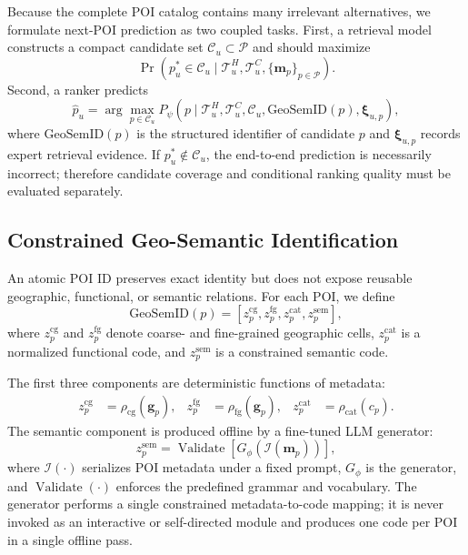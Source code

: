 \documentclass[journal]{IEEEtran}
\newcommand{\gsid}{\mathrm{GeoSemID}}
\newcommand{\POIs}{\mathcal{P}}
\begin{document}
Because the complete POI catalog contains many irrelevant alternatives, we
formulate next-POI prediction as two coupled tasks.
First, a retrieval model constructs a compact candidate set
$\mathcal{C}_u\subset\POIs$ and should maximize
\begin{equation}
\Pr(p_u^{*}\in\mathcal{C}_u
\mid
\mathcal{T}_{u}^{H},\mathcal{T}_{u}^{C},\{\bm{m}_p\}_{p\in\POIs}).
\label{eq:coverage_objective}
\end{equation}
Second, a ranker predicts
\begin{equation}
\widehat{p}_{u}
=
\arg\max_{p\in\mathcal{C}_u}
P_{\psi}
\left(
p\mid
\mathcal{T}_{u}^{H},
\mathcal{T}_{u}^{C},
\mathcal{C}_u,
\gsid(p),
\bm{\xi}_{u,p}
\right),
\label{eq:final_prediction}
\end{equation}
where $\gsid(p)$ is the structured identifier of candidate $p$ and
$\bm{\xi}_{u,p}$ records expert retrieval evidence.
If $p_u^{*}\notin\mathcal{C}_u$, the end-to-end prediction is necessarily
incorrect; therefore candidate coverage and conditional ranking quality must
be evaluated separately.

\subsection{Constrained Geo-Semantic Identification}

An atomic POI ID preserves exact identity but does not expose reusable
geographic, functional, or semantic relations.
For each POI, we define
\begin{equation}
\gsid(p)
=
[
z_{p}^{\mathrm{cg}},
z_{p}^{\mathrm{fg}},
z_{p}^{\mathrm{cat}},
z_{p}^{\mathrm{sem}}
],
\label{eq:geosemid_definition}
\end{equation}
where $z_{p}^{\mathrm{cg}}$ and $z_{p}^{\mathrm{fg}}$ denote coarse- and
fine-grained geographic cells, $z_{p}^{\mathrm{cat}}$ is a normalized
functional code, and $z_{p}^{\mathrm{sem}}$ is a constrained semantic code.

The first three components are deterministic functions of metadata:
\begin{align}
z_{p}^{\mathrm{cg}}&=\rho_{\mathrm{cg}}(\bm{g}_p),&
z_{p}^{\mathrm{fg}}&=\rho_{\mathrm{fg}}(\bm{g}_p),&
z_{p}^{\mathrm{cat}}&=\rho_{\mathrm{cat}}(c_p).
\label{eq:deterministic_codes}
\end{align}
The semantic component is produced offline by a fine-tuned LLM generator:
\begin{equation}
z_{p}^{\mathrm{sem}}
=
\operatorname{Validate}
\left[
G_{\phi}\!\left(\mathcal{I}(\bm{m}_p)\right)
\right],
\label{eq:semantic_generation}
\end{equation}
where $\mathcal{I}(\cdot)$ serializes POI metadata under a fixed prompt,
$G_{\phi}$ is the generator, and $\operatorname{Validate}(\cdot)$ enforces
the predefined grammar and vocabulary.
The generator performs a single constrained metadata-to-code mapping; it is
never invoked as an interactive or self-directed module and produces one code
per POI in a single offline pass.
\end{document}
